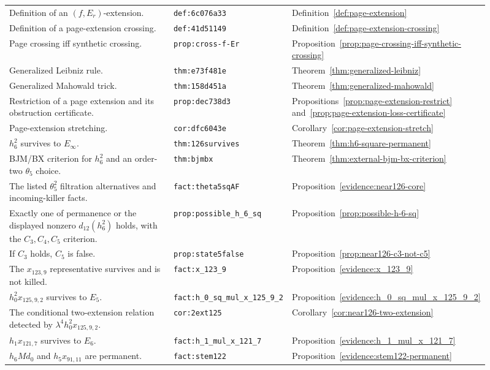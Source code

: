 \begin{center}
\begin{tabular}{p{0.49\linewidth}p{0.17\linewidth}p{0.25\linewidth}}
Definition of an $(f,E_r)$-extension. & \texttt{def:6c076a33} & Definition~\ref{def:page-extension} \\
Definition of a page-extension crossing. & \texttt{def:41d51149} & Definition~\ref{def:page-extension-crossing} \\
Page crossing iff synthetic crossing. & \texttt{prop:cross-f-Er} & Proposition~\ref{prop:page-crossing-iff-synthetic-crossing} \\
Generalized Leibniz rule. & \texttt{thm:e73f481e} & Theorem~\ref{thm:generalized-leibniz} \\
Generalized Mahowald trick. & \texttt{thm:158d451a} & Theorem~\ref{thm:generalized-mahowald} \\
Restriction of a page extension and its obstruction certificate. & \texttt{prop:dec738d3} & Propositions~\ref{prop:page-extension-restrict} and~\ref{prop:page-extension-loss-certificate} \\
Page-extension stretching. & \texttt{cor:dfc6043e} & Corollary~\ref{cor:page-extension-stretch} \\
$h_6^2$ survives to $E_\infty$. & \texttt{thm:126survives} & Theorem~\ref{thm:h6-square-permanent} \\
BJM/BX criterion for $h_6^2$ and an order-two $\theta_5$ choice. & \texttt{thm:bjmbx} & Theorem~\ref{thm:external-bjm-bx-criterion} \\
The listed $\theta_5^2$ filtration alternatives and incoming-killer facts. & \texttt{fact:theta5sqAF} & Proposition~\ref{evidence:near126-core} \\
Exactly one of permanence or the displayed nonzero $d_{12}(h_6^2)$ holds, with the $C_3,C_4,C_5$ criterion. & \texttt{prop:possible\_h\_6\_sq} & Proposition~\ref{prop:possible-h-6-sq} \\
If $C_3$ holds, $C_5$ is false. & \texttt{prop:state5false} & Proposition~\ref{prop:near126-c3-not-c5} \\
The $x_{123,9}$ representative survives and is not killed. & \texttt{fact:x\_123\_9} & Proposition~\ref{evidence:x_123_9} \\
$h_0^2x_{125,9,2}$ survives to $E_5$. & \texttt{fact:h\_0\_sq\_mul\_x\_125\_9\_2} & Proposition~\ref{evidence:h_0_sq_mul_x_125_9_2} \\
The conditional two-extension relation detected by $\lambda^4h_0^2x_{125,9,2}$. & \texttt{cor:2ext125} & Corollary~\ref{cor:near126-two-extension} \\
$h_1x_{121,7}$ survives to $E_6$. & \texttt{fact:h\_1\_mul\_x\_121\_7} & Proposition~\ref{evidence:h_1_mul_x_121_7} \\
$h_6Md_0$ and $h_5x_{91,11}$ are permanent. & \texttt{fact:stem122} & Proposition~\ref{evidence:stem122-permanent} \\
\end{tabular}
\end{center}


